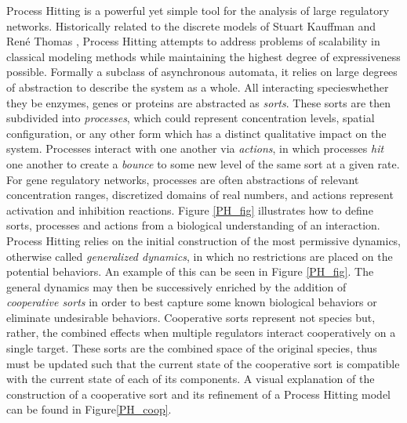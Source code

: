 \documentclass{article}
\begin{document}
Process Hitting is a powerful yet simple tool for the analysis of large regulatory networks. Historically related to the discrete models of Stuart Kauffman \cite{kauffman1969metabolic} and Ren\'{e} Thomas \cite{thomas1991regulatory}, Process Hitting attempts to address problems of scalability in classical modeling methods while maintaining the highest degree of expressiveness possible. Formally a subclass of asynchronous automata, it relies on large degrees of abstraction to describe the system as a whole. All interacting species\textemdash whether they be  enzymes, genes or proteins \textemdash are abstracted as \textit{sorts}. These sorts are then subdivided into \textit{processes}, which could represent concentration levels, spatial configuration, or any other form which has a distinct qualitative impact on the system. Processes interact with one another via \textit{actions}, in which processes \textit{hit} one another to create a \textit{bounce} to some new level of the same sort at a given rate. For gene regulatory networks, processes are often abstractions of relevant concentration ranges, discretized domains of real numbers, and actions represent activation and inhibition reactions. Figure \ref{PH_fig} illustrates how to define sorts, processes and actions from a biological understanding of an interaction. Process Hitting relies on the initial construction of the most permissive dynamics, otherwise called \textit{generalized dynamics}, in which no restrictions are placed on the potential behaviors. An example of this can be seen in Figure \ref{PH_fig}. The general dynamics may then be successively enriched by the addition of \textit{cooperative sorts} in order to best capture some known biological behaviors or eliminate undesirable behaviors. Cooperative sorts represent not species but, rather, the combined effects when multiple regulators interact cooperatively on a single target. These sorts are the combined space of the original species, thus must be updated such that the current state of the cooperative sort is compatible with the current state of each of its components. A visual explanation of the construction of a cooperative sort and its refinement of a Process Hitting model can be found in Figure\ref{PH_coop}.\\
\end{document}
